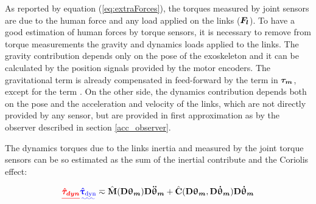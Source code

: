 As reported by equation (\ref{eq:extraForces}), the torques measured by joint sensors are due to the human force and any load applied on the links (${ \boldsymbol {F_l}}$). To have a good estimation of human forces by torque sensors, it is necessary to remove from torque measurements the gravity and dynamics loads applied to the links. The gravity contribution  depends only on the pose of the exoskeleton and it can be calculated by the position signals provided by the motor encoders. The gravitational term is already compensated in feed-forward by the term \DIFdelbegin {}\DIFdelend \DIFaddbegin {}\DIFaddend in ${ \boldsymbol {\tau_{m}}}$,
except for the term \DIFdelbegin {}\DIFdelend \DIFaddbegin {}\DIFaddend .
On the other side, the dynamics contribution depends both on the pose and the acceleration and velocity of the links, which are not directly provided by any sensor, but are provided in first approximation as \DIFdelbegin {}\DIFdelend \DIFaddbegin {}\DIFaddend by the observer described in section \ref{acc_observer}.

The dynamics torques due to the links inertia and measured by the joint torque sensors can be so estimated as the sum of the inertial contribute and the Coriolis effect:

\begin{equation}\DIFdelbegin \DIFdel{
\vects{\hat{\tau}_{dyn}}  }\DIFdelend \DIFaddbegin \DIFadd{
\vects{\hat{\uptau}_{\text{dyn}}}  }\DIFaddend \eqsim \hat{\vectm{M}}(\vectm{D} \DIFdelbegin %
\DIFdelend \DIFaddbegin \vects{\uptheta_m}\DIFaddend ) \vectm{D} \DIFdelbegin %
\DIFdelend \DIFaddbegin \vects{\ddot{\uptheta}_m}\DIFaddend +\hat{\vectm{C}}(\vectm{D} \DIFdelbegin %
\DIFdelend \DIFaddbegin \vects{\uptheta_m}\DIFaddend ,\vectm{D} \DIFdelbegin %
\DIFdelend \DIFaddbegin \vects{\dot{\uptheta}_m}\DIFaddend )\vectm{D} \DIFdelbegin %
\DIFdelend \DIFaddbegin \vects{\dot{\uptheta}_m}
\DIFaddend \end{equation}

